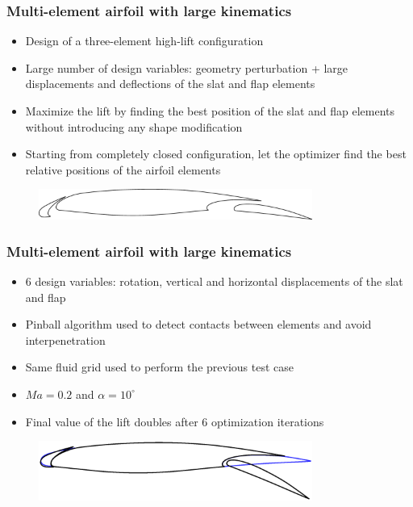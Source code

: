 
\begin{frame}
  \frametitle{Multi-element airfoil with large kinematics}
  \begin{itemize}
  \item Design of a three-element high-lift configuration
  \item Large number of design variables: geometry perturbation + 
        large displacements and deflections of the slat and flap elements
  \item Maximize the lift by finding the best position of the slat and flap
    elements without introducing any shape modification
  \item Starting from completely closed configuration, let the optimizer find 
    the best relative positions of the airfoil elements
  \end{itemize}
  \begin{figure}
    \centering
    \includegraphics[width=0.8\textwidth]{Fig/L1T2_halfopen}
  \end{figure} 
\end{frame}


\begin{frame}
   \frametitle{Multi-element airfoil with large kinematics}
    \begin{itemize}
    \item 6 design variables: rotation, vertical and horizontal displacements of the
      slat and flap 
    \item Pinball algorithm used to detect contacts between elements and
      avoid interpenetration
    \item Same fluid grid used to perform the previous test case
    \item $Ma = 0.2$ and $\alpha = 10^\circ$
    \item Final value of the lift doubles after 6 optimization iterations
    \end{itemize}
    \begin{figure}
      \centering
      \includegraphics[width=0.8\textwidth]{Fig/L1T2_dep}
     \end{figure}
\end{frame}

